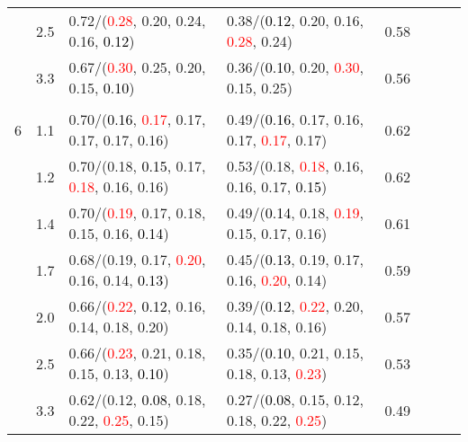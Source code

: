 \documentclass[10pt,a4paper]{report}
\begin{document}
\begin{table}[!htbp]
\begin{center}
{\begin{tabular}{ccllcccc}
			&2.5&0.72/(\textcolor{red}{0.28}, 0.20, 0.24, 0.16, \textcolor{black}{0.12})&0.38/(\textcolor{black}{0.12}, 0.20, 0.16, \textcolor{red}{0.28}, 0.24)&0.58\\
			&3.3&0.67/(\textcolor{red}{0.30}, 0.25, 0.20, 0.15, \textcolor{black}{0.10})&0.36/(\textcolor{black}{0.10}, 0.20, \textcolor{red}{0.30}, 0.15, 0.25)&0.56\\
			&&&&\\
			6			&1.1&0.70/(\textcolor{black}{0.16}, \textcolor{red}{0.17}, 0.17, 0.17, 0.17, 0.16)&0.49/(\textcolor{black}{0.16}, 0.17, 0.16, 0.17, \textcolor{red}{0.17}, 0.17)&0.62\\
			&1.2&0.70/(0.18, \textcolor{black}{0.15}, 0.17, \textcolor{red}{0.18}, 0.16, 0.16)&0.53/(0.18, \textcolor{red}{0.18}, 0.16, 0.16, 0.17, \textcolor{black}{0.15})&0.62\\
			&1.4&0.70/(\textcolor{red}{0.19}, 0.17, 0.18, 0.15, 0.16, \textcolor{black}{0.14})&0.49/(\textcolor{black}{0.14}, 0.18, \textcolor{red}{0.19}, 0.15, 0.17, 0.16)&0.61\\
			&1.7&0.68/(0.19, 0.17, \textcolor{red}{0.20}, 0.16, 0.14, \textcolor{black}{0.13})&0.45/(\textcolor{black}{0.13}, 0.19, 0.17, 0.16, \textcolor{red}{0.20}, 0.14)&0.59\\
			&2.0&0.66/(\textcolor{red}{0.22}, \textcolor{black}{0.12}, 0.16, 0.14, 0.18, 0.20)&0.39/(\textcolor{black}{0.12}, \textcolor{red}{0.22}, 0.20, 0.14, 0.18, 0.16)&0.57\\
			&2.5&0.66/(\textcolor{red}{0.23}, 0.21, 0.18, 0.15, 0.13, \textcolor{black}{0.10})&0.35/(\textcolor{black}{0.10}, 0.21, 0.15, 0.18, 0.13, \textcolor{red}{0.23})&0.53\\
			&3.3&0.62/(0.12, \textcolor{black}{0.08}, 0.18, 0.22, \textcolor{red}{0.25}, 0.15)&0.27/(\textcolor{black}{0.08}, 0.15, 0.12, 0.18, 0.22, \textcolor{red}{0.25})&0.49\\
			\bottomrule
		\end{tabular}}
	\end{center}
\end{table}
\end{document}
